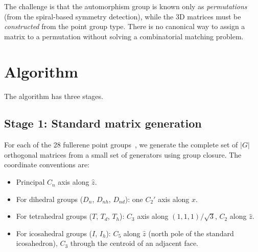 \documentclass[11pt]{article}
\begin{document}
The challenge is that the automorphism group is known only as
\emph{permutations} (from the spiral-based symmetry detection), while
the 3D matrices must be \emph{constructed} from the point group type.
There is no canonical way to assign a matrix to a permutation without
solving a combinatorial matching problem.

\section{Algorithm}
\label{sec:algorithm}

The algorithm has three stages.

\subsection{Stage 1: Standard matrix generation}
\label{sec:generation}

For each of the 28 fullerene point groups~\cite{deza2009}, we generate
the complete set of $|G|$ orthogonal matrices from a small set of
generators using group closure.  The coordinate conventions are:
\begin{itemize}
  \item Principal $C_n$ axis along $\hat{z}$.
  \item For dihedral groups ($D_n$, $D_{nh}$, $D_{nd}$): one $C_2'$
    axis along $\hat{x}$.
  \item For tetrahedral groups ($T$, $T_d$, $T_h$): $C_3$ axis along
    $(1,1,1)/\sqrt{3}$, $C_2$ along $\hat{z}$.
  \item For icosahedral groups ($I$, $I_h$): $C_5$ along $\hat{z}$
    (north pole of the standard icosahedron), $C_3$ through the centroid
    of an adjacent face.
\end{itemize}
\end{document}
